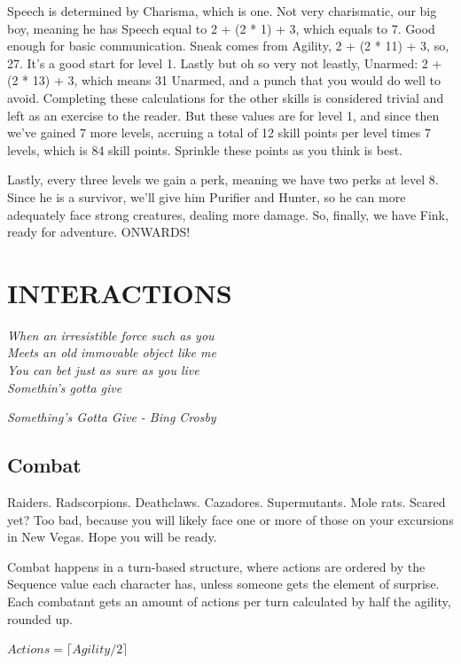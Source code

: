 \documentclass[11pt]{article} %
\begin{document}
Speech is determined by Charisma, which is one. Not very charismatic, our big boy, meaning he has Speech equal to 2 + (2 * 1) + 3, which equals to 7. Good enough for basic communication. Sneak comes from Agility, 2 + (2 * 11) + 3, so, 27. It's a good start for level 1. Lastly but oh so very not leastly, Unarmed: 2 + (2 * 13) + 3, which means 31 Unarmed, and a punch that you would do well to avoid. Completing these calculations for the other skills is considered trivial and left as an exercise to the reader. But these values are for level 1, and since then we've gained 7 more levels, accruing a total of 12 skill points per level times 7 levels, which is 84 skill points. Sprinkle these points as you think is best.

Lastly, every three levels we gain a perk, meaning we have two perks at level 8. Since he is a survivor, we'll give him Purifier and Hunter, so he can more adequately face strong creatures, dealing more damage. So, finally, we have Fink, ready for adventure. ONWARDS!


\newpage


\section{INTERACTIONS}

\epigraph{\textit{When an irresistible force such as you \\
Meets an old immovable object like me \\
You can bet just as sure as you live \\
Somethin's gotta give}}{\textit{Something's Gotta Give - Bing Crosby}}

\subsection{Combat}

Raiders. Radscorpions. Deathclaws. Cazadores. Supermutants. Mole rats. Scared yet? Too bad, because you will likely face one or more of those on your excursions in New Vegas. Hope you will be ready.

Combat happens in a turn-based structure, where actions are ordered by the Sequence value each character has, unless someone gets the element of surprise. Each combatant gets an amount of actions per turn calculated by half the agility, rounded up.

\begin{center}
	$Actions = \lceil Agility / 2 \rceil$
\end{center}
\end{document}
